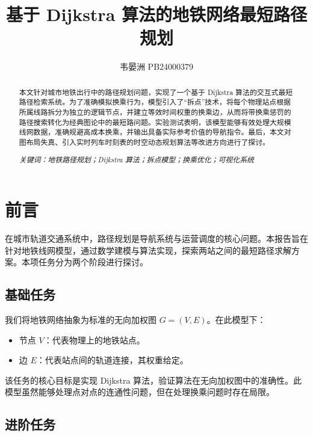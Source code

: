 

\title{\bfseries 基于 Dijkstra 算法的地铁网络最短路径规划}
\author{韦晏洲 \quad PB24000379}


	\maketitle
	\begin{abstract}
		本文针对城市地铁出行中的路径规划问题，实现了一个基于 Dijkstra 算法的交互式最短路径检索系统。为了准确模拟换乘行为，模型引入了“拆点”技术，将每个物理站点根据所属线路拆分为独立的逻辑节点，并建立等效时间权重的换乘边，从而将带换乘惩罚的路径搜索转化为经典图论中的最短路问题。实验测试表明，该模型能够有效处理大规模线网数据，准确规避高成本换乘，并输出具备实际参考价值的导航指令。最后，本文对图布局失真、引入实时列车时刻表的时空动态规划算法等改进方向进行了探讨。
		
		\textit{关键词：地铁路径规划；Dijkstra 算法；拆点模型；换乘优化；可视化系统}
	\end{abstract}
	\clearpage
	\section{前言}
	
	在城市轨道交通系统中，路径规划是导航系统与运营调度的核心问题。本报告旨在针对地铁线网模型，通过数学建模与算法实现，探索两站之间的最短路径求解方案。本项任务分为两个阶段进行探讨。
	
	\subsection{基础任务}
	
	我们将地铁网络抽象为标准的无向加权图 $G = (V, E)$。在此模型下：
	
	\begin{itemize}
	\item 节点 $V$：代表物理上的地铁站点。

	\item 边 $E$：代表站点间的轨道连接，其权重给定。
	\end{itemize}

	该任务的核心目标是实现 Dijkstra 算法，验证算法在无向加权图中的准确性。此模型虽然能够处理点对点的连通性问题，但在处理换乘问题时存在局限。
	
	\subsection{进阶任务}
	
